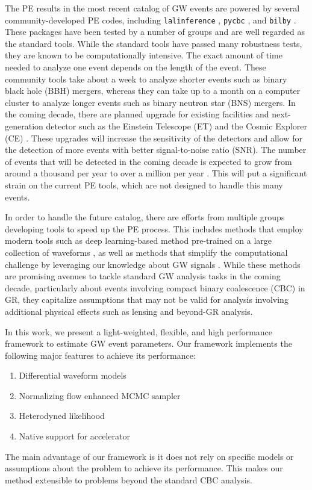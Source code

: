\documentclass[twocolumn]{aastex631}
\begin{document}
The PE results in the most recent catalog of GW events are powered by several
community-developed PE codes, including \texttt{lalinference}
\cite{Veitch:2014wba}, \texttt{pycbc} \cite{Biwer:2018osg}, and \texttt{bilby}
\cite{Ashton:2018jfp}. These packages have been tested by a number of groups and
are well regarded as the standard tools. While the standard tools have passed
many robustness tests, they are known to be computationally intensive. The exact
amount of time needed to analyze one event depends on the length of the event.
These community tools take about a week to analyze shorter events such as binary
black hole (BBH) mergers, whereas they can take up to a month on a computer
cluster to analyze longer events such as binary neutron star (BNS) mergers. In
the coming decade, there are planned upgrade for existing facilities and
next-generation detector such as the Einstein Telescope (ET)
\cite{Punturo:2010zz} and the Cosmic Explorer (CE)
\cite{LIGOScientific:2016wof}. These upgrades will increase the sensitivity of
the detectors and allow for the detection of more events with better
signal-to-noise ratio (SNR). The number of events that will be detected in the
coming decade is expected to grow from around a thousand per year to over a
million per year \cite{Baibhav:2019gxm}. This will put a significant strain on
the current PE tools, which are not designed to handle this many events.

In order to handle the future catalog, there are efforts from multiple groups
developing tools to speed up the PE process. This includes methods that employ
modern tools such as deep learning-based method pre-trained on a large
collection of waveforms \cite{Dax:2021tsq,Dax:2022pxd}, as well as methods that
simplify the computational challenge by leveraging our knowledge about GW
signals \cite{Islam:2022afg,Roulet:2022kot}. While these methods are promising
avenues to tackle standard GW analysis tasks in the coming decade, particularly
about events involving compact binary coalescence (CBC) in GR, they capitalize
assumptions that may not be valid for analysis involving additional physical
effects such as lensing and beyond-GR analysis.


In this work, we present a light-weighted, flexible, and high performance
framework to estimate GW event parameters. Our framework implements the
following major features to achieve its performance:
\begin{enumerate}
\setlength{\itemsep}{0pt}
\item Differential waveform models
\item Normalizing flow enhanced MCMC sampler
\item Heterodyned likelihood
\item Native support for accelerator
\end{enumerate}
The main advantage of our framework is it does not rely on specific models or
assumptions about the problem to achieve its performance. This makes our method
extensible to problems beyond the standard CBC analysis. 
\end{document}
